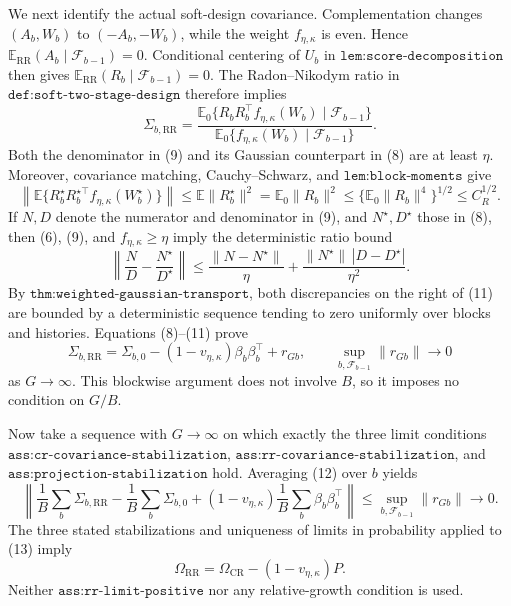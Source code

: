 We next identify the actual soft-design covariance.  Complementation changes \((A_b,W_b)\) to \((-A_b,-W_b)\), while the weight \(f_{\eta,\kappa}\) is even.  Hence \(\mathbb E_{\mathrm{RR}}(A_b\mid\mathcal F_{b-1})=0\).  Conditional centering of \(U_b\) in \(\texttt{lem:score-decomposition}\) then gives \(\mathbb E_{\mathrm{RR}}(R_b\mid\mathcal F_{b-1})=0\).  The Radon--Nikodym ratio in \(\texttt{def:soft-two-stage-design}\) therefore implies
\[
 \Sigma_{b,\mathrm{RR}}
 =\frac{\mathbb E_0\{R_bR_b^\top f_{\eta,\kappa}(W_b)
                         \mid\mathcal F_{b-1}\}}
        {\mathbb E_0\{f_{\eta,\kappa}(W_b)
                         \mid\mathcal F_{b-1}\}}.                        \tag{9}
\]
Both the denominator in (9) and its Gaussian counterpart in (8) are at least \(\eta\).  Moreover, covariance matching, Cauchy--Schwarz, and \(\texttt{lem:block-moments}\) give
\[
 \left\|\mathbb E\{R_b^\star R_b^{\star\top}
                         f_{\eta,\kappa}(W_b^\star)\}\right\|
 \leq\mathbb E\|R_b^\star\|^2
 =\mathbb E_0\|R_b\|^2
 \leq\{\mathbb E_0\|R_b\|^4\}^{1/2}\leq C_R^{1/2}.                 \tag{10}
\]
If \(N,D\) denote the numerator and denominator in (9), and \(N^\star,D^\star\) those in (8), then (6), (9), and \(f_{\eta,\kappa}\geq\eta\) imply the deterministic ratio bound
\[
 \left\|\frac ND-\frac{N^\star}{D^\star}\right\|
 \leq\frac{\|N-N^\star\|}{\eta}
     +\frac{\|N^\star\|\,|D-D^\star|}{\eta^2}.                       \tag{11}
\]
By \(\texttt{thm:weighted-gaussian-transport}\), both discrepancies on the right of (11) are bounded by a deterministic sequence tending to zero uniformly over blocks and histories.  Equations (8)--(11) prove
\[
 \Sigma_{b,\mathrm{RR}}
 =\Sigma_{b,0}-(1-v_{\eta,\kappa})\beta_b\beta_b^\top+r_{Gb},
 \qquad
 \sup_{b,\mathcal F_{b-1}}\|r_{Gb}\|\longrightarrow0                  \tag{12}
\]
as \(G\to\infty\).  This blockwise argument does not involve \(B\), so it imposes no condition on \(G/B\).

Now take a sequence with \(G\to\infty\) on which exactly the three limit conditions \(\texttt{ass:cr-covariance-stabilization}\), \(\texttt{ass:rr-covariance-stabilization}\), and \(\texttt{ass:projection-stabilization}\) hold.  Averaging (12) over \(b\) yields
\[
 \left\|\frac1B\sum_b\Sigma_{b,\mathrm{RR}}
 -\frac1B\sum_b\Sigma_{b,0}
 +(1-v_{\eta,\kappa})\frac1B\sum_b\beta_b\beta_b^\top\right\|
 \leq\sup_{b,\mathcal F_{b-1}}\|r_{Gb}\|\longrightarrow0.             \tag{13}
\]
The three stated stabilizations and uniqueness of limits in probability applied to (13) imply
\[
 \Omega_{\mathrm{RR}}=\Omega_{\mathrm{CR}}-(1-v_{\eta,\kappa})P.       \tag{14}
\]
Neither \(\texttt{ass:rr-limit-positive}\) nor any relative-growth condition is used.

